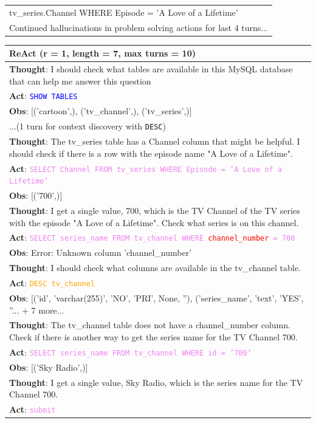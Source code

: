 \begin{table}
\begin{minipage}[t]{.49\linewidth}
\begin{tabularx}{\textwidth}{X}
{{tv\_series.Channel WHERE Episode = 'A Love of a Lifetime'}} \\
Continued hallucinations in problem solving actions for last 4 turns... \\
\bottomrule
\end{tabularx}
\end{minipage}
\begin{minipage}[t]{.49\linewidth}
\begin{tabularx}{\textwidth}{X}
\toprule
\textbf{ReAct} (r = 1, length = 7, max turns = 10) \\
\midrule
\textbf{Thought}: I should check what tables are available in this MySQL database that can help me answer this 
question \\
\textbf{Act}: \textcolor{blue}{\texttt{SHOW TABLES}} \\
\textbf{Obs}: [('cartoon',), ('tv\_channel',), ('tv\_series',)] \\
...(1 turn for context discovery with \texttt{DESC}) \\
\textbf{Thought}: The tv\_series table has a Channel column that might be helpful. I should check if there is a row with the episode name "A Love of a Lifetime". \\
\textbf{Act}: \textcolor{violet}{\texttt{SELECT Channel FROM tv\_series WHERE Episode = 'A Love of a Lifetime'}} \\
\textbf{Obs}: [('700',)] \\
\textbf{Thought}: I get a single value, 700, which is the TV Channel of the TV series with the episode "A Love of a
Lifetime". Check what series is on this channel. \\
\textbf{Act}: \textcolor{violet}{\texttt{SELECT series\_name FROM tv\_channel WHERE \textcolor{red}{channel\_number} = 700}} \\
\textbf{Obs}: Error: Unknown column 'channel\_number' \\
\textbf{Thought}: I should check what columns are available in the tv\_channel table. \\
\textbf{Act}: \textcolor{orange}{\texttt{DESC tv\_channel}} \\
\textbf{Obs}: [('id', 'varchar(255)', 'NO', 'PRI', None, ''), ('series\_name', 'text', 'YES', ''... + 7 more... \\
\textbf{Thought}: The tv\_channel table does not have a channel\_number column. Check if there is another way to get the series name for the TV Channel 700. \\
\textbf{Act}: \textcolor{violet}{\texttt{SELECT series\_name FROM tv\_channel WHERE id = '700'}} \\
\textbf{Obs}: [('Sky Radio',)] \\
\textbf{Thought}: I get a single value, Sky Radio, which is the series name for the TV Channel 700. \\
\textbf{Act}: \textcolor{violet}{\texttt{submit}} \\
\bottomrule
\end{tabularx}
\end{minipage}


\end{table}

